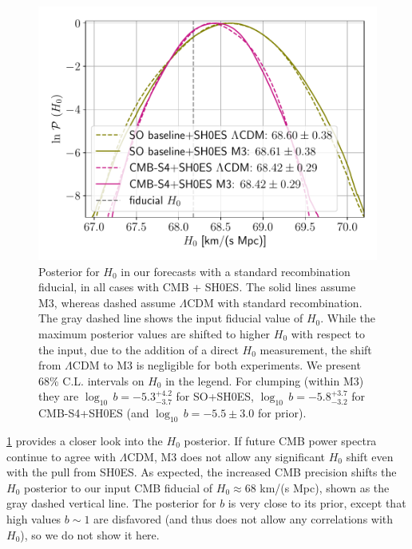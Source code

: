 \begin{figure}[ht!]
\includegraphics[width=\columnwidth]{img/H0-CMBSH0ES-1Dpost.pdf}
\caption[Posterior for $H_0$ in our forecasts with a standard recombination fiducial, in all cases with CMB + SH0ES]{Posterior for $H_0$ in our forecasts with a standard recombination fiducial, in all cases with CMB + SH0ES.
The solid lines assume M3, whereas dashed assume $\Lambda$CDM with standard recombination.
The gray dashed line shows the input fiducial value of $H_0$.
While the maximum posterior values are shifted to higher $H_0$ with respect to the input, due to the addition of a direct $H_0$ measurement, the shift from $\Lambda$CDM to M3 is negligible for both experiments.
We present 68\% C.L. intervals on $H_0$ in the legend.
For clumping (within M3) they are $\log_{10}\,b = -5.3^{+4.2}_{-3.7}$ for SO+SH0ES, $\log_{10}\,b = -5.8^{+3.7}_{-3.2}$ for CMB-S4+SH0ES (and $\log_{10}\,b = -5.5\pm 3.0$ for prior).}
\label{fig:H0-CMBSH0ES}
\end{figure}

\cref{fig:H0-CMBSH0ES} provides a closer look into the $H_0$ posterior.
If future CMB power spectra continue to agree with $\Lambda$CDM, M3 does not allow any significant $H_0$ shift even with the pull from SH0ES.
As expected, the increased CMB precision shifts the $H_0$ posterior to our input CMB fiducial of $H_0\approx 68$ km/(s Mpc), shown as the gray dashed vertical line.
The posterior for $b$ is very close to its prior, except that high values $b\sim 1$ are disfavored (and thus does not allow any correlations with $H_0$), so we do not show it here.

